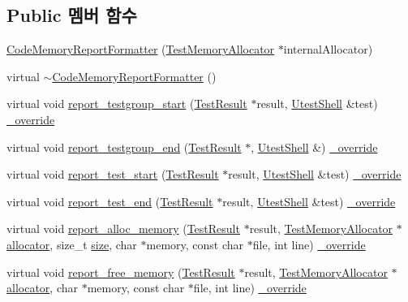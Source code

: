 \subsection*{Public 멤버 함수}
\begin{DoxyCompactItemize}
\item 
\hyperlink{class_code_memory_report_formatter_a91ded3a4619f7c76ea870067e3c8037c}{Code\+Memory\+Report\+Formatter} (\hyperlink{class_test_memory_allocator}{Test\+Memory\+Allocator} $\ast$internal\+Allocator)
\item 
virtual \hyperlink{class_code_memory_report_formatter_ae2c822376c389d96ab99f662ecb9bcf3}{$\sim$\+Code\+Memory\+Report\+Formatter} ()
\item 
virtual void \hyperlink{class_code_memory_report_formatter_a5752211789cc4a3478f07498cf8e3006}{report\+\_\+testgroup\+\_\+start} (\hyperlink{class_test_result}{Test\+Result} $\ast$result, \hyperlink{class_utest_shell}{Utest\+Shell} \&test) \hyperlink{_cpp_u_test_config_8h_a049bea15dd750e15869863c94c1efc3b}{\+\_\+override}
\item 
virtual void \hyperlink{class_code_memory_report_formatter_a654fe66c6d74e1276278ad0fbf6af3aa}{report\+\_\+testgroup\+\_\+end} (\hyperlink{class_test_result}{Test\+Result} $\ast$, \hyperlink{class_utest_shell}{Utest\+Shell} \&) \hyperlink{_cpp_u_test_config_8h_a049bea15dd750e15869863c94c1efc3b}{\+\_\+override}
\item 
virtual void \hyperlink{class_code_memory_report_formatter_ab6b7ea5f2e0c5bdad43b71b76881f362}{report\+\_\+test\+\_\+start} (\hyperlink{class_test_result}{Test\+Result} $\ast$result, \hyperlink{class_utest_shell}{Utest\+Shell} \&test) \hyperlink{_cpp_u_test_config_8h_a049bea15dd750e15869863c94c1efc3b}{\+\_\+override}
\item 
virtual void \hyperlink{class_code_memory_report_formatter_a2b191434b124b93d8c0ed5a05e084e02}{report\+\_\+test\+\_\+end} (\hyperlink{class_test_result}{Test\+Result} $\ast$result, \hyperlink{class_utest_shell}{Utest\+Shell} \&test) \hyperlink{_cpp_u_test_config_8h_a049bea15dd750e15869863c94c1efc3b}{\+\_\+override}
\item 
virtual void \hyperlink{class_code_memory_report_formatter_a662fcaf995e9e0137c8debfc33530366}{report\+\_\+alloc\+\_\+memory} (\hyperlink{class_test_result}{Test\+Result} $\ast$result, \hyperlink{class_test_memory_allocator}{Test\+Memory\+Allocator} $\ast$\hyperlink{_memory_leak_warning_test_8cpp_a83fc2e9b9142613f7df2bcc3ff8292bc}{allocator}, size\+\_\+t \hyperlink{gst__avb__playbin_8c_a439227feff9d7f55384e8780cfc2eb82}{size}, char $\ast$memory, const char $\ast$file, int line) \hyperlink{_cpp_u_test_config_8h_a049bea15dd750e15869863c94c1efc3b}{\+\_\+override}
\item 
virtual void \hyperlink{class_code_memory_report_formatter_ae5e392cdf5fece2cbd2eeb25e8478c8f}{report\+\_\+free\+\_\+memory} (\hyperlink{class_test_result}{Test\+Result} $\ast$result, \hyperlink{class_test_memory_allocator}{Test\+Memory\+Allocator} $\ast$\hyperlink{_memory_leak_warning_test_8cpp_a83fc2e9b9142613f7df2bcc3ff8292bc}{allocator}, char $\ast$memory, const char $\ast$file, int line) \hyperlink{_cpp_u_test_config_8h_a049bea15dd750e15869863c94c1efc3b}{\+\_\+override}
\end{DoxyCompactItemize}
